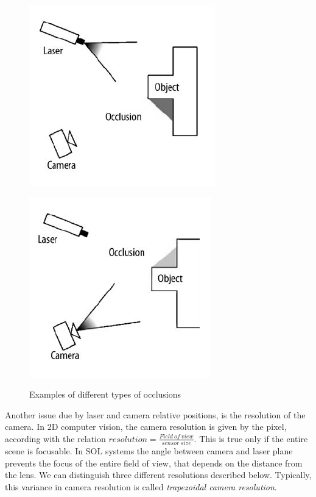 \begin{figure}[h!]
  \centering
  \begin{minipage}[c]{.50\textwidth}
  	\centering
    \includegraphics[width=.6\textwidth]{./images/tech/occlusion1.png}
    \label{fig:occlusions_laser}
  \end{minipage}%
  \begin{minipage}[c]{.50\textwidth}
  	\centering
    \includegraphics[width=.6\textwidth]{./images/tech/occlusion2.png}
    \label{fig:occlusions_camera}
  \end{minipage}
  \caption{Examples of different types of occlusions}
  \label{fig:occlusions}
\end{figure}

Another issue due by laser and camera relative positions, is the resolution of the camera. In 2D computer vision, the camera resolution is given by the pixel, according with the relation $resolution = \frac{Field \: of \: view}{sensor \: size}$. This is true only if the entire scene is focusable. In \acs{SOL} systems the angle between camera and laser plane prevents the focus of the entire field of view, that depends on the distance from the lens. We can distinguish three different resolutions described below. Typically, this variance in camera resolution is called \textit{trapezoidal camera resolution}. \\

